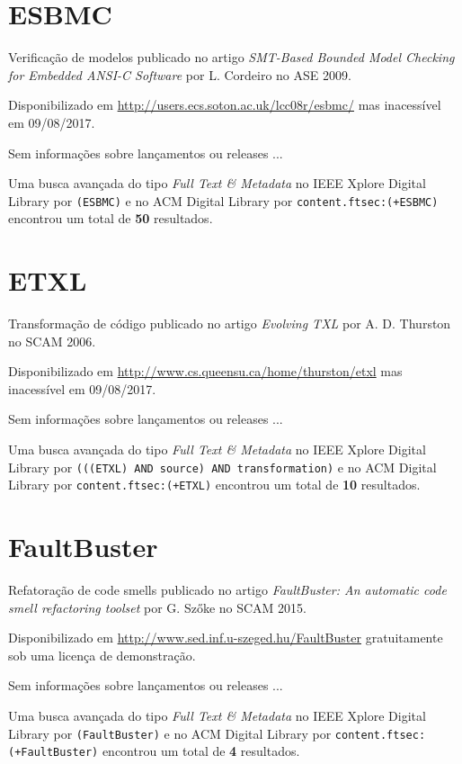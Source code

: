 \section{ESBMC}

Verificação de modelos
publicado no artigo {\it SMT-Based Bounded Model Checking for Embedded ANSI-C Software}
por L. Cordeiro
no ASE 2009.

Disponibilizado em \url{http://users.ecs.soton.ac.uk/lcc08r/esbmc/}
mas inacessível em 09/08/2017.

Sem informações sobre lançamentos ou releases ...


Uma busca avançada do tipo {\it Full Text \& Metadata} no IEEE Xplore Digital Library por
\texttt{(ESBMC)}
e no ACM Digital Library por
\texttt{content.ftsec:(+ESBMC)}
encontrou um total de
{\bf 50}
resultados.

\section{ETXL}

Transformação de código
publicado no artigo {\it Evolving TXL}
por A. D. Thurston
no SCAM 2006.

Disponibilizado em \url{http://www.cs.queensu.ca/home/thurston/etxl}
mas inacessível em 09/08/2017.

Sem informações sobre lançamentos ou releases ...


Uma busca avançada do tipo {\it Full Text \& Metadata} no IEEE Xplore Digital Library por
\texttt{(((ETXL) AND source) AND transformation)}
e no ACM Digital Library por
\texttt{content.ftsec:(+ETXL)}
encontrou um total de
{\bf 10}
resultados.

\section{FaultBuster}

Refatoração de code smells
publicado no artigo {\it FaultBuster: An automatic code smell refactoring toolset}
por G. Szőke
no SCAM 2015.

Disponibilizado em \url{http://www.sed.inf.u-szeged.hu/FaultBuster}
gratuitamente
sob uma licença de demonstração.

Sem informações sobre lançamentos ou releases ...


Uma busca avançada do tipo {\it Full Text \& Metadata} no IEEE Xplore Digital Library por
\texttt{(FaultBuster)}
e no ACM Digital Library por
\texttt{content.ftsec:(+FaultBuster)}
encontrou um total de
{\bf 4}
resultados.

